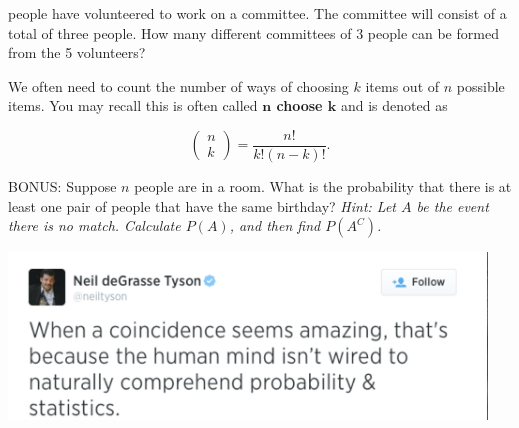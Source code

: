 


\clearpage



\bb[resume]
 people have volunteered to work on a committee. The committee will consist of a total of three people. How many different committees of 3 people can be formed from the 5 volunteers? \vfill
\ee


\bbox
We often need to count the number of ways of choosing $k$ items out of $n$ possible items. You may recall this is often called \textbf{$\mathbf{n}$ choose $\mathbf{k}$} and is denoted as

\[ \left( \begin{array}{c} n \\ k \end{array}\right) = \frac{n!}{k!(n-k)!}.\]
\ebox

\bb[resume]
\ii BONUS: Suppose $n$ people are in a room. What is the probability that there is at least one pair of people that have the same birthday? \textit{Hint: Let $A$ be the event there is no match. Calculate $P(A)$, and then find $P(A^C)$.} %

\vfill

\ee




\begin{center}
\includegraphics[width=5in]{03/tyson-tweet.png}
\end{center}
\bs


